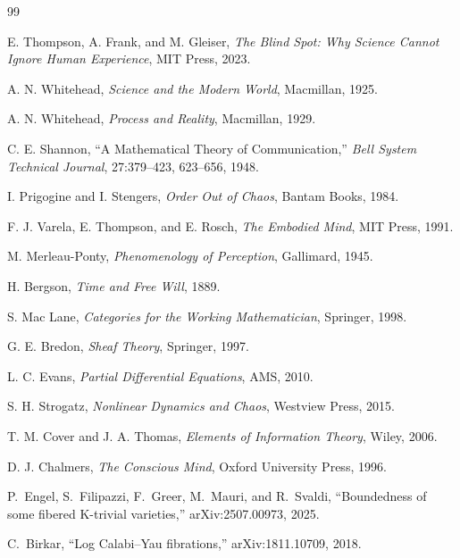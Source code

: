 \documentclass[11pt,openany]{book}
\begin{document}
\backmatter


\begin{thebibliography}{99}

E. Thompson, A. Frank, and M. Gleiser,
\textit{The Blind Spot: Why Science Cannot Ignore Human Experience},
MIT Press, 2023.

A. N. Whitehead,
\textit{Science and the Modern World},
Macmillan, 1925.

A. N. Whitehead,
\textit{Process and Reality},
Macmillan, 1929.

C. E. Shannon,
``A Mathematical Theory of Communication,''
\textit{Bell System Technical Journal}, 27:379--423, 623--656, 1948.

I. Prigogine and I. Stengers,
\textit{Order Out of Chaos},
Bantam Books, 1984.

F. J. Varela, E. Thompson, and E. Rosch,
\textit{The Embodied Mind},
MIT Press, 1991.

M. Merleau-Ponty,
\textit{Phenomenology of Perception},
Gallimard, 1945.

H. Bergson,
\textit{Time and Free Will},
1889.

S. Mac Lane,
\textit{Categories for the Working Mathematician},
Springer, 1998.

G. E. Bredon,
\textit{Sheaf Theory},
Springer, 1997.

L. C. Evans,
\textit{Partial Differential Equations},
AMS, 2010.

S. H. Strogatz,
\textit{Nonlinear Dynamics and Chaos},
Westview Press, 2015.

T. M. Cover and J. A. Thomas,
\textit{Elements of Information Theory},
Wiley, 2006.

D. J. Chalmers,
\textit{The Conscious Mind},
Oxford University Press, 1996.


P.~Engel, S.~Filipazzi, F.~Greer, M.~Mauri, and R.~Svaldi,
``Boundedness of some fibered K-trivial varieties,''
arXiv:2507.00973, 2025.

C.~Birkar,
``Log Calabi--Yau fibrations,''
arXiv:1811.10709, 2018.


\end{thebibliography}
\end{document}
